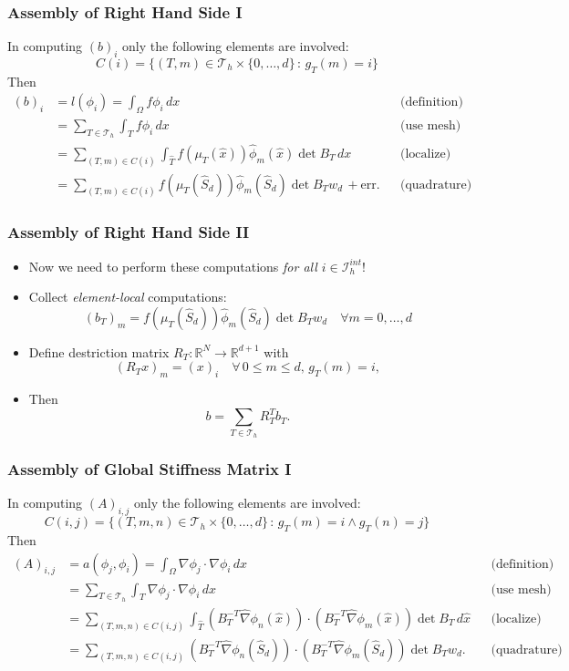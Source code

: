 \documentclass[ignorenonframetext,11pt]{beamer}
\theoremstyle{definition}
\begin{document}
\begin{frame}
\frametitle{Assembly of Right Hand Side I}
In computing $(b)_i$ only the following elements are involved:
$$C(i) = \{(T,m)\in\mathcal{T}_h\times\{0,\ldots,d\} \,:\, g_T(m)=i\}$$
Then
\begin{align*}
(b)_i &= l(\phi_i) = \int_\Omega f \phi_i\,dx &&\text{(definition)} \\
&= \sum_{T\in\mathcal{T}_h} \int_T f \phi_i\,dx &&\text{(use mesh)} \\
&= \sum_{(T,m)\in C(i)} \int_{\hat T} f(\mu_T(\hat x)) \hat\phi_m(\hat x) \det B_T\,dx 
&&\text{(localize)} \\
&= \sum_{(T,m)\in C(i)} 
f(\mu_T(\hat S_d)) \hat\phi_m(\hat S_d) \det B_T w_d \, + \text{err}. &&\text{(quadrature)} 
\end{align*}
\end{frame}

\begin{frame}
\frametitle{Assembly of Right Hand Side II}
\begin{itemize}
\item Now we need to perform these computations {\em for all $i\in\mathcal{I}_h^{int}$}!
\item Collect {\em element-local} computations:
\begin{equation*}
(b_T)_m =  f(\mu_T(\hat S_d)) \hat\phi_m(\hat S_d) \det B_T w_d \quad \forall m=0,\ldots,d 
\end{equation*}
\item Define {destriction matrix} $R_T : \mathbb{R}^N \to \mathbb{R}^{d+1}$ with
\begin{equation*}
(R_T x)_m = (x)_i \quad \forall \,0\leq m \leq d, \,g_T(m)=i,
\end{equation*}
\item Then
\begin{equation*}
b = \sum_{T\in\mathcal{T}_h} R_T^T b_T .
\end{equation*}
\end{itemize}
\end{frame}

\begin{frame}
\frametitle{Assembly of Global Stiffness Matrix I}
In computing $(A)_{i,j}$ only the following elements are involved:
$$C(i,j) = \{(T,m,n)\in\mathcal{T}_h\times\{0,\ldots,d\} \,:\, g_T(m)=i \wedge g_T(n)=j\}$$
Then
{\small\begin{align*}
(A)_{i,j} &= a(\phi_j,\phi_i) = \int_\Omega \nabla \phi_j \cdot \nabla \phi_i \,dx 
&&\text{(definition)}\\
&= \sum_{T\in\mathcal{T}_h} \int_T \nabla \phi_j \cdot \nabla \phi_i \,dx
&&\text{(use mesh)}\\
&= \sum_{(T,m,n)\in C(i,j)}
\int_{\hat T} (B_T^{-T} \hat\nabla\phi_n(\hat x))\cdot (B_T^{-T} \hat\nabla\phi_m(\hat x))
\det B_T \,d\hat x &&\text{(localize)}\\
&= \sum_{(T,m,n)\in C(i,j)}
(B_T^{-T} \hat\nabla\phi_n(\hat S_d))\cdot (B_T^{-T} \hat\nabla\phi_m(\hat S_d))
\det B_T w_d . &&\text{(quadrature)}
\end{align*}}
\end{frame}
\end{document}

